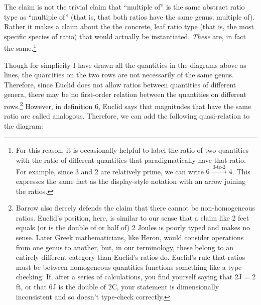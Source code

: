 \documentclass[11pt]{article}
\newcommand{\flushleftright}{\noindent\justifying}
\begin{document}
\flushleftright%
The claim is not the trivial claim that ``multiple of'' is the same abstract ratio type as ``multiple of'' (that is, that both ratios have the same genus, multiple of). Rather it makes a claim about the the concrete, leaf ratio type (that is, the most specific species of ratio) that would actually be instantiated. \textit{These} are, in fact the same.\footnote{For this reason, it is occasionally helpful to label the ratio of two quantities with the ratio of different quantities that paradigmatically have that ratio. For example, since 3 and 2 are relatively prime, we can write $6\xrightarrow{\;3\text{-to-}2\;}4$. This expresses the same fact as the display-style notation with an arrow joining the ratios.}

Though for simplicity I have drawn all the quantities in the diagrams above as lines, the quantities on the two rows are not necessarily of the same genus. Therefore, since Euclid does not allow ratios between quantities of different genera, there may be no first-order relation between the quantities on different rows.\footnote{Barrow also fiercely defends the claim that there cannot be non-homogeneous ratios. Euclid's position, here, is similar to our sense that a claim like 2 feet equals (or is the double of or half of) 2 Joules is poorly typed and makes no sense. Later Greek mathematicians, like Heron, would consider operations from one genus to another, but, in our terminology, these belong to an entirely different category than Euclid's ratios do. Euclid's rule that ratios must be between homogeneous quantities functions something like a type-checking: If, after a series of calculations, you find yourself saying that 2J = 2 ft, or that 6J is the double of 2C, your statement is dimensionally inconsistent and so doesn't type-check correctly.} However, in definition 6, Euclid says that magnitudes that have the same ratio are called analogous. Therefore, we can add the following quasi-relation to the diagram:
\end{document}
